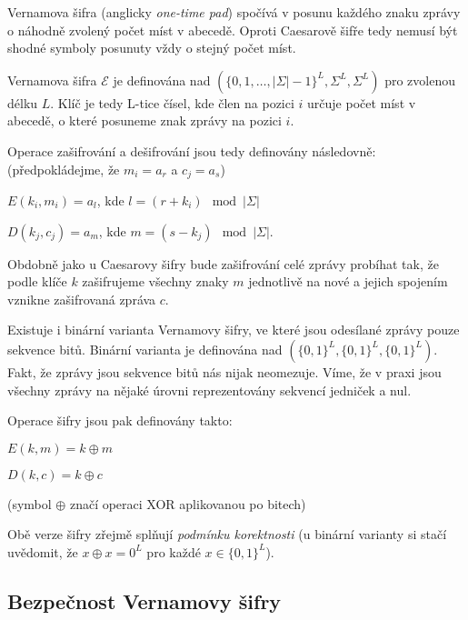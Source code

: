 \documentclass[
  program=infoi,
  biblatex,
  figures=false,
  glossaries,
  index
]{kidiplom}
\begin{document}

    Vernamova šifra (anglicky \emph{one-time pad}) spočívá v posunu každého znaku zprávy o náhodně zvolený počet míst v abecedě.
    Oproti Caesarově šifře tedy nemusí být shodné symboly posunuty vždy o stejný počet míst.

    Vernamova šifra $\mathcal{E}$ je definována nad $(\{0, 1, \ldots, |\Sigma|-1\}^L, \Sigma^L, \Sigma^L)$ pro zvolenou délku $L$.
    Klíč je tedy L-tice čísel, kde člen na pozici $i$ určuje počet míst v abecedě, o které posuneme znak zprávy na pozici $i$.

    \medskip

    Operace zašifrování a dešifrování jsou tedy definovány následovně:
    (předpokládejme, že $m_i = a_r$ a $c_j = a_s$)

    \begin{center}
        $E(k_i, m_i) = a_l$, kde $l = (r+k_i)\mod{|\Sigma|}$

        $D(k_j, c_j) = a_m$, kde $m = (s-k_j)\mod{|\Sigma|}$.
    \end{center}

    Obdobně jako u Caesarovy šifry bude zašifrování celé zprávy probíhat tak, že podle klíče $k$ zašifrujeme všechny znaky $m$ jednotlivě na nové a
    jejich spojením vznikne zašifrovaná zpráva $c$.

    \bigskip

    Existuje i binární varianta Vernamovy šifry, ve které jsou odesílané zprávy pouze sekvence bitů.
    Binární varianta je definována nad $(\{0,1\}^L, \{0,1\}^L, \{0,1\}^L)$.
    Fakt, že zprávy jsou sekvence bitů nás nijak neomezuje. Víme, že v praxi jsou všechny zprávy na nějaké úrovni
    reprezentovány sekvencí jedniček a nul.

    \medskip

    Operace šifry jsou pak definovány takto:

    \begin{center}
        $E(k, m) = k \oplus m$

        $D(k, c) = k \oplus c$
    \end{center}

    (symbol $\oplus$ značí operaci XOR aplikovanou po bitech)

    \bigskip
    Obě verze šifry zřejmě splňují \emph{podmínku korektnosti} (u binární varianty si stačí uvědomit, že $x \oplus x = 0^L$ pro každé $x \in \{0,1\}^L$).


    \subsection{Bezpečnost Vernamovy šifry}
\end{document}
